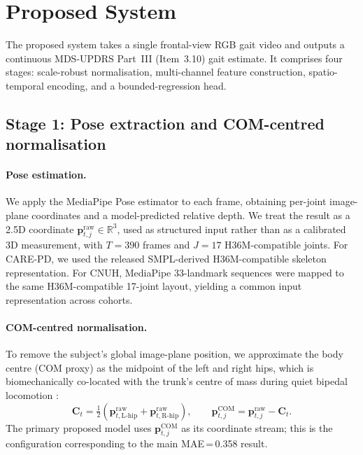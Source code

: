 \documentclass[preprint,12pt]{elsarticle}
\begin{document}
\section{Proposed System}
\label{sec:method}

The proposed system takes a single frontal-view RGB gait video and outputs a
continuous MDS-UPDRS Part~III (Item~3.10) gait estimate. It comprises four
stages: scale-robust normalisation, multi-channel feature construction,
spatio-temporal encoding, and a bounded-regression head.

\subsection{Stage 1: Pose extraction and COM-centred normalisation}
\label{sec:stage1}

\paragraph{Pose estimation.}
We apply the MediaPipe Pose estimator \cite{bazarevsky2020blazepose} to each
frame, obtaining per-joint image-plane coordinates and a model-predicted
relative depth. We treat the result as a 2.5D coordinate
$\mathbf{p}^{\text{raw}}_{t,j}\in\mathbb{R}^{3}$, used as structured input
rather than as a calibrated 3D measurement, with $T=390$ frames and $J=17$
H36M-compatible joints. For CARE-PD, we used the released SMPL-derived
H36M-compatible skeleton representation. For CNUH, MediaPipe 33-landmark
sequences were mapped to the same H36M-compatible 17-joint layout, yielding a
common input representation across cohorts.

\paragraph{COM-centred normalisation.}
To remove the subject's global image-plane position, we approximate the body
centre (COM proxy) as the midpoint of the left and right hips, which is
biomechanically co-located with the trunk's centre of mass during quiet
bipedal locomotion \cite{winter2009biomechanics}:
\begin{equation}
\mathbf{C}_t = \tfrac{1}{2}\!\left(
\mathbf{p}^{\text{raw}}_{t,\text{L-hip}}+\mathbf{p}^{\text{raw}}_{t,\text{R-hip}}\right),
\qquad
\mathbf{p}^{\text{COM}}_{t,j}=\mathbf{p}^{\text{raw}}_{t,j}-\mathbf{C}_t .
\label{eq:trans}
\end{equation}
The primary proposed model uses $\mathbf{p}^{\text{COM}}_{t,j}$ as its
coordinate stream; this is the configuration corresponding to the main
MAE\,=\,0.358 result.
\end{document}
